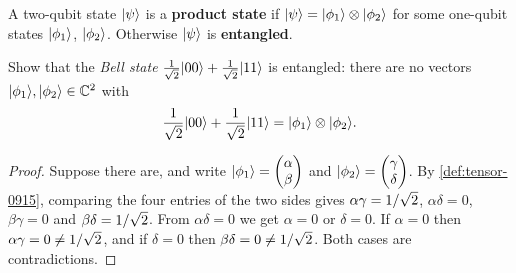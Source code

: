 \begin{definition}
    A two-qubit state $\lvert \psi \rangle$ is a \textbf{product state} if
    $\lvert \psi \rangle = \lvert \phi_1 \rangle \otimes \lvert \phi_2 \rangle$ for some one-qubit states $\lvert \phi_1 \rangle$,
    $\lvert \phi_2 \rangle$. Otherwise $\lvert \psi \rangle$ is \textbf{entangled}.
\end{definition}

\begin{exercisebox}
\begin{exercise}\label{ex:bell-0915}\label{thm:bell-0915}
    Show that the \emph{Bell state} $\frac{1}{\sqrt{2}} \lvert 00 \rangle + \frac{1}{\sqrt{2}} \lvert 11 \rangle$ is
    entangled: there are no vectors $\lvert \phi_1 \rangle, \lvert \phi_2 \rangle \in \mathbb{C}^2$ with
    \[\frac{1}{\sqrt{2}} \lvert 00 \rangle + \frac{1}{\sqrt{2}} \lvert 11 \rangle = \lvert \phi_1 \rangle \otimes \lvert \phi_2 \rangle.\]
\end{exercise}
\tcblower
\begin{proof}
    Suppose there are, and write $\lvert \phi_1 \rangle = \begin{pmatrix} \alpha \\ \beta \end{pmatrix}$ and
    $\lvert \phi_2 \rangle = \begin{pmatrix} \gamma \\ \delta \end{pmatrix}$. By \cref{def:tensor-0915},
    comparing the four entries of the two sides gives $\alpha\gamma = 1/\sqrt{2}$,
    $\alpha\delta = 0$, $\beta\gamma = 0$ and $\beta\delta = 1/\sqrt{2}$.
    From $\alpha\delta = 0$ we get $\alpha = 0$ or $\delta = 0$. If $\alpha = 0$ then
    $\alpha\gamma = 0 \neq 1/\sqrt{2}$, and if $\delta = 0$ then
    $\beta\delta = 0 \neq 1/\sqrt{2}$. Both cases are contradictions.
\end{proof}
\end{exercisebox}
